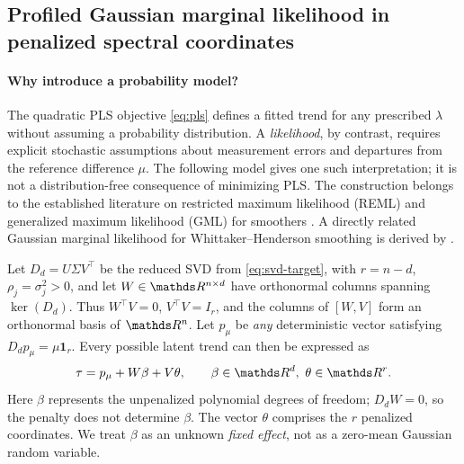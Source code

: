 \subsection{Profiled Gaussian marginal likelihood in penalized spectral coordinates}
\label{sec:gaussian-likelihood}

\paragraph{Why introduce a probability model?}
The quadratic PLS objective \eqref{eq:pls} defines a fitted
trend for any prescribed $\lambda$ without assuming a
probability distribution. A \emph{likelihood}, by contrast,
requires explicit stochastic assumptions about measurement
errors and departures from the reference difference $\mu$.
The following model gives one such interpretation; it is
not a distribution-free consequence of minimizing PLS.
The construction belongs to the established literature
on restricted maximum likelihood (REML) and
generalized maximum likelihood (GML) for smoothers
\citep{patterson1971,wahba1985,wood2011}.
A directly related Gaussian marginal likelihood for
Whittaker--Henderson smoothing is derived by
\citet[Sec.~5.3]{biessy2026}.

Let $D_d=U\Sigma V^\top$ be the reduced SVD from
\eqref{eq:svd-target}, with $r=n-d$,
$\rho_j=\sigma_j^2>0$, and let
$W\in\R^{n\times d}$ have orthonormal columns
spanning $\ker(D_d)$. Thus $W^\top V=0$,
$V^\top V=I_r$, and the columns of $[W,V]$
form an orthonormal basis of $\R^n$. Let
$p_\mu$ be \emph{any} deterministic vector
satisfying $D_dp_\mu=\mu\mathbf1_r$.
Every possible latent trend can then be expressed
as
\begin{equation}\label{eq:likelihood-decomposition}
\tau=p_\mu+W\beta+V\theta,\qquad
\beta\in\R^d,\ \theta\in\R^r .
\end{equation}
Here $\beta$ represents the unpenalized polynomial
degrees of freedom; $D_dW=0$, so the penalty does
not determine $\beta$. The vector $\theta$ comprises
the $r$ penalized coordinates. We treat $\beta$
as an unknown \emph{fixed effect}, not as a
zero-mean Gaussian random variable.


